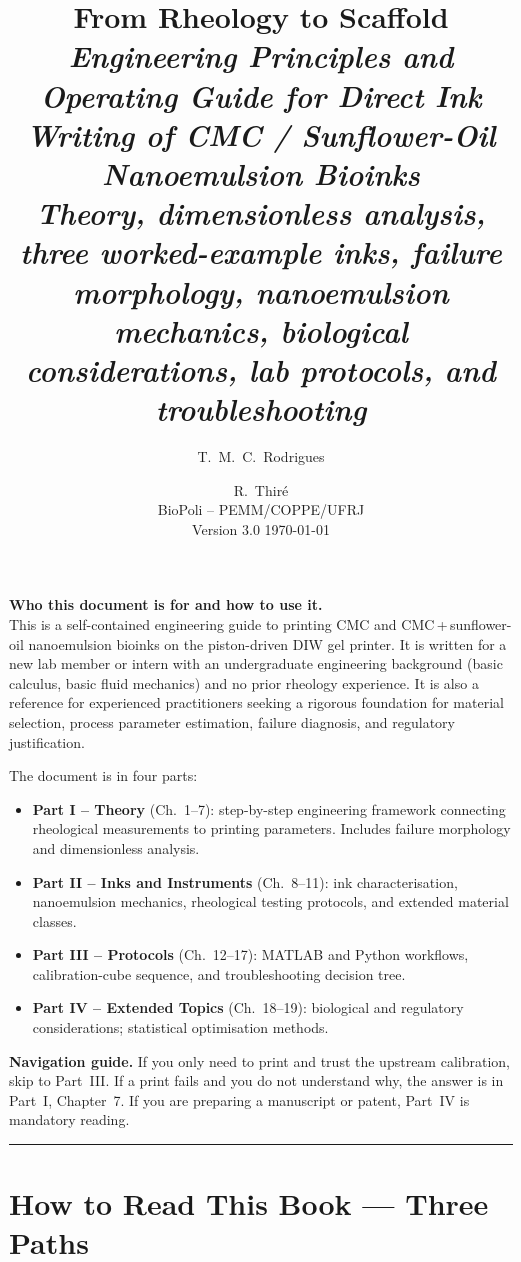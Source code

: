 \documentclass[11pt,a4paper]{article}
\title{\textbf{From Rheology to Scaffold}\\[4pt]
\large \textsl{Engineering Principles and Operating Guide for Direct
Ink Writing of CMC / Sunflower-Oil Nanoemulsion Bioinks}\\[4pt]
\normalsize \textsl{Theory, dimensionless analysis, three worked-example inks,
failure morphology, nanoemulsion mechanics, biological considerations,
lab protocols, and troubleshooting}}
\author{T.~M.~C.~Rodrigues \and R.~Thir\'e \\[2pt]
\small BioPoli -- PEMM/COPPE/UFRJ \\[2pt]
\small Version 3.0 \quad \today}
\date{}
\begin{document}
\maketitle
\thispagestyle{fancy}

\begin{tcolorbox}[colback=blue!3!white,colframe=blue!50!black,
                  arc=2mm,boxrule=0.4pt,left=8pt,right=8pt]
\textbf{Who this document is for and how to use it.}\\
This is a self-contained engineering guide to printing CMC and
CMC\,+\,sunflower-oil nanoemulsion bioinks on the piston-driven DIW gel
printer. It is written for a new lab member or intern with an
undergraduate engineering background (basic calculus, basic fluid
mechanics) and no prior rheology experience. It is also a reference for
experienced practitioners seeking a rigorous foundation for material
selection, process parameter estimation, failure diagnosis, and regulatory
justification.

\medskip
The document is in four parts:
\begin{itemize}[leftmargin=1.4em,itemsep=2pt]
\item \textbf{Part I -- Theory} (Ch.~1--7): step-by-step engineering
framework connecting rheological measurements to printing parameters.
Includes failure morphology and dimensionless analysis.
\item \textbf{Part II -- Inks and Instruments} (Ch.~8--11): ink
characterisation, nanoemulsion mechanics, rheological testing protocols,
and extended material classes.
\item \textbf{Part III -- Protocols} (Ch.~12--17): MATLAB and Python
workflows, calibration-cube sequence, and troubleshooting decision tree.
\item \textbf{Part IV -- Extended Topics} (Ch.~18--19): biological and
regulatory considerations; statistical optimisation methods.
\end{itemize}

\medskip
\textbf{Navigation guide.} If you only need to print and trust the
upstream calibration, skip to Part~III. If a print fails and you do not
understand why, the answer is in Part~I, Chapter~7. If you are preparing
a manuscript or patent, Part~IV is mandatory reading.
\end{tcolorbox}

\tableofcontents
\bigskip\hrule\bigskip

\clearpage
\section*{How to Read This Book --- Three Paths}
\end{document}
